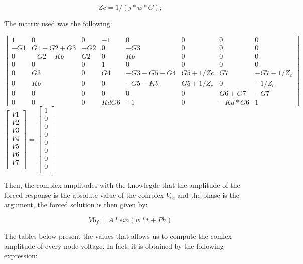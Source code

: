 \begin{equation}
Zc=1/(j*w*C);
\end{equation} 

\par The matrix used was the following:

$\begin{bmatrix}
1 & 0 & 0 & -1 & 0 & 0 & 0 & 0 \\
-G1 & G1+G2+G3 & -G2 & 0 & -G3 & 0 & 0 & 0 \\
0 & -G2-Kb & G2 & 0 & Kb & 0 & 0 & 0 \\
0 & 0 & 0 & 1 & 0 & 0 & 0 & 0 \\
0 & G3 & 0 & G4 &-G3-G5-G4 & G5+1/Zc & G7 & -G7-1/Z_{c}\\
0 & Kb & 0 & 0 & -G5-Kb & G5+1/Z_{c} & 0 & -1/Z_{c} \\
0 & 0 & 0 & 0 & 0 & 0 & G6+G7& -G7 \\
0 & 0 & 0 & KdG6 & -1 & 0 & -Kd*G6 & 1
\end{bmatrix}$
$\begin{bmatrix}
V1 \\ V2 \\ V3 \\ V4 \\ V5 \\ V6 \\ V7 \\ 
\end{bmatrix}$
= 
$\begin{bmatrix}
1 \\ 0 \\ 0 \\ 0 \\ 0 \\ 0 \\ 0 \\ 0 \\ 
\end{bmatrix}$
\par Then, the complex amplitudes with the knowlegde that the amplitude of the forced response is the absolute value of the complex $V_{6}$, and the phase is the argument, the forced solution is then given by:

\begin{equation}
V6_f=A*sin(w*t+Ph)
\end{equation} 

\par The tables below present the values that allows us to compute the comlex amplitude of every node voltage. In fact, it is obtained by the following expression: 

